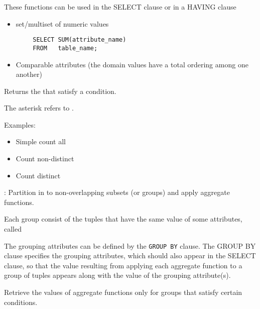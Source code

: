 \par These functions can be used in the SELECT clause or in a HAVING clause


      \begin{itemize}
        \item set/multiset of numeric values
      \end{itemize}

      \begin{verbatim}
        SELECT SUM(attribute_name)
        FROM   table_name;
      \end{verbatim}

      \begin{itemize}
        \item Comparable attributes (the domain values have a total ordering among one another)
      \end{itemize}

      \par Returns the  that satisfy a condition.
      \par The asterisk refers to .
      \par Examples:
        \begin{itemize}
          \item Simple count all
          \item Count non-distinct
          \item Count distinct
        \end{itemize}

  \par {}: Partition in to non-overlapping subsets (or groups) and apply aggregate functions.

    \par Each group consist of the tuples that have the same value of some attributes, called 

    \par The grouping attributes can be defined by the \lstinline{GROUP BY} clause. The GROUP BY clause specifies the grouping attributes, which should also appear in the SELECT clause, so that the value resulting from applying each aggregate function to a group of tuples appears along with the value of the grouping attribute(s).

    \par Retrieve the values of aggregate functions only for groups that satisfy certain conditions.

